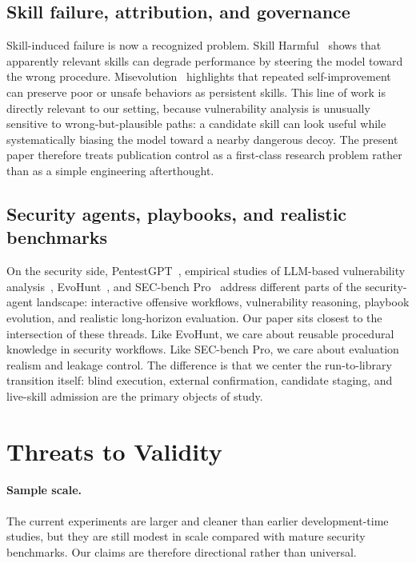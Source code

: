 \documentclass[11pt]{article}
\begin{document}
\subsection{Skill failure, attribution, and governance}

Skill-induced failure is now a recognized problem.  Skill Harmful~\cite{skillharmful}
shows that apparently relevant skills can degrade performance by steering the model
toward the wrong procedure.  Misevolution~\cite{misevolution} highlights that repeated
self-improvement can preserve poor or unsafe behaviors as persistent skills.  This line
of work is directly relevant to our setting, because vulnerability analysis is unusually
sensitive to wrong-but-plausible paths: a candidate skill can look useful while
systematically biasing the model toward a nearby dangerous decoy.  The present paper
therefore treats publication control as a first-class research problem rather than as a
simple engineering afterthought.

\subsection{Security agents, playbooks, and realistic benchmarks}

On the security side, PentestGPT~\cite{pentestgpt}, empirical studies of LLM-based
vulnerability analysis~\cite{steenhoek2024vulndetect}, EvoHunt~\cite{evohunt}, and SEC-bench Pro~\cite{secbenchpro}
address different parts of the security-agent landscape: interactive offensive
workflows, vulnerability reasoning, playbook evolution, and realistic long-horizon
evaluation.  Our paper sits closest to the intersection of these threads.  Like
EvoHunt, we care about reusable procedural knowledge in security workflows.  Like
SEC-bench Pro, we care about evaluation realism and leakage control.  The difference is
that we center the run-to-library transition itself: blind execution, external
confirmation, candidate staging, and live-skill admission are the primary objects of
study.

\section{Threats to Validity}
\label{sec:threats}

\paragraph{Sample scale.}
The current experiments are larger and cleaner than earlier development-time studies, but
they are still modest in scale compared with mature security benchmarks.  Our claims are
therefore directional rather than universal.
\end{document}
